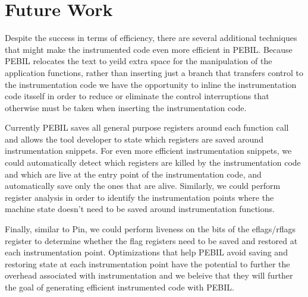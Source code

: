 \section{Future Work}
\label{sec:Future}

Despite the success in terms of efficiency, there are several additional techniques
that might make the instrumented code even more efficient in PEBIL. Because PEBIL relocates
the text to yeild extra space for the manipulation of the application functions, 
rather than inserting just a branch
that transfers control to the instrumentation code we have the opportunity to inline
the instrumentation code itsself
in order to reduce or eliminate the control interruptions  that otherwise must be taken 
when inserting the instrumentation code.

Currently PEBIL saves all general purpose registers around each function call and allows the
tool developer to state which registers are saved around instrumentation snippets. For even more efficient instrumentation
snippets, we could automatically detect which registers are killed by the instrumentation code and which are live at the entry point
of the instrumentation code, and automatically save only the ones that are alive. Similarly, we could perform register 
analysis in order to identify the instrumentation points where the machine state doesn't need to be saved around instrumentation functions. 

Finally, similar to Pin, we could perform liveness on the bits of the eflags/rflags register to determine whether the flag registers need to be saved and
restored at each instrumentation point. Optimizations that help PEBIL avoid saving and restoring state at each instrumentation point 
have the potential to further the overhead associated with instrumentation and we beleive 
that they will further the goal of generating efficient instrumented code with PEBIL.


